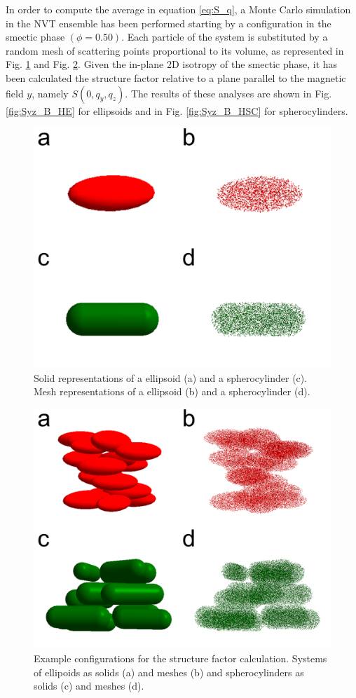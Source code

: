 \documentclass[aip,graphicx]{revtex4-1}
\begin{document}
In order to compute the average in equation \ref{eq:S_q}, a Monte Carlo simulation in the NVT ensemble has been performed starting by a configuration in the smectic phase $(\phi = 0.50)$. Each particle of the system is substituted by a random mesh of scattering points proportional to its volume, as represented in Fig. \ref{fig:scatt_mod_single} and Fig. \ref{fig:scatt_mod1}. Given the in-plane 2D isotropy of the smectic phase, it has been calculated the structure factor relative to a plane parallel to the magnetic field $y$, namely $S(0, q_y, q_z)$. The results of these analyses are shown in Fig. \ref{fig:Syz_B_HE} for ellipsoids and in Fig. \ref{fig:Syz_B_HSC} for spherocylinders.

\begin{figure}
    \centering
    \includegraphics[width=0.5\columnwidth]{Scatteringmodel_single.png}
    \caption{Solid representations of a ellipsoid (a) and a spherocylinder (c). Mesh representations of a ellipsoid (b) and a spherocylinder (d).}
    \label{fig:scatt_mod_single}
\end{figure}

\begin{figure}
    \centering
    \includegraphics[width=0.5\columnwidth]{Scatteringmodel1.png}
    \caption{Example configurations for the structure factor calculation. Systems of ellipoids as solids (a) and meshes (b) and spherocylinders as solids (c) and meshes (d).}
    \label{fig:scatt_mod1}
\end{figure}
\end{document}
